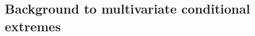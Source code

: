 \documentclass[12pt,compact]{article}
\begin{document}
\subsection{Background to multivariate conditional extremes}
\label{subsec:ce_model}

\end{document}
